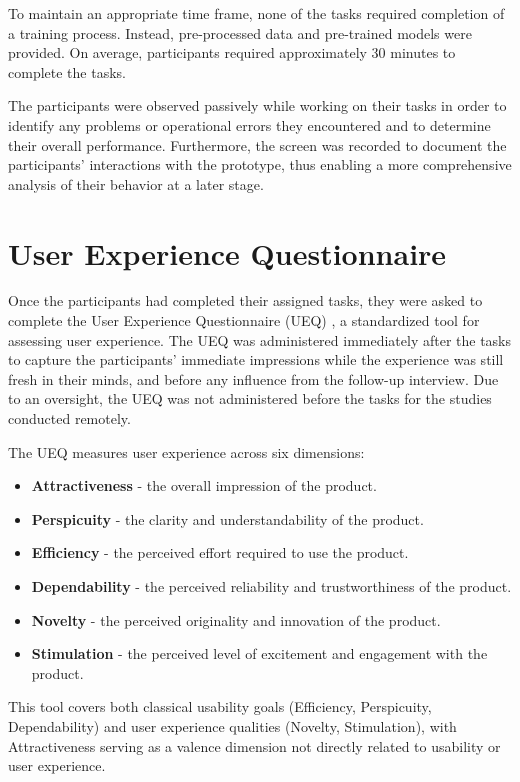 To maintain an appropriate time frame, none of the tasks required completion of a training process. 
Instead, pre-processed data and pre-trained models were provided.
On average, participants required approximately 30 minutes to complete the tasks.

The participants were observed passively while working on their tasks in order to identify any problems or operational errors they encountered and to determine their overall performance.
Furthermore, the screen was recorded to document the participants' interactions with the prototype, thus enabling a more comprehensive analysis of their behavior at a later stage.

\section{User Experience Questionnaire}
\label{sec:study:ueq}

Once the participants had completed their assigned tasks, they were asked to complete the User Experience Questionnaire (UEQ) \cite{laugwitz_construction_2008}, a standardized tool for assessing user experience.
The UEQ was administered immediately after the tasks to capture the participants' immediate impressions while the experience was still fresh in their minds, and before any influence from the follow-up interview.
Due to an oversight, the UEQ was not administered before the tasks for the studies conducted remotely.

The UEQ measures user experience across six dimensions:

\begin{itemize}
  \item \textbf{Attractiveness} - the overall impression of the product.
  \item \textbf{Perspicuity} - the clarity and understandability of the product.
  \item \textbf{Efficiency} - the perceived effort required to use the product.
  \item \textbf{Dependability} - the perceived reliability and trustworthiness of the product.
  \item \textbf{Novelty} - the perceived originality and innovation of the product.
  \item \textbf{Stimulation} - the perceived level of excitement and engagement with the product.
\end{itemize}

This tool covers both classical usability goals (Efficiency, Perspicuity, Dependability) and user experience qualities (Novelty, Stimulation), with Attractiveness serving as a valence dimension not directly related to usability or user experience.

